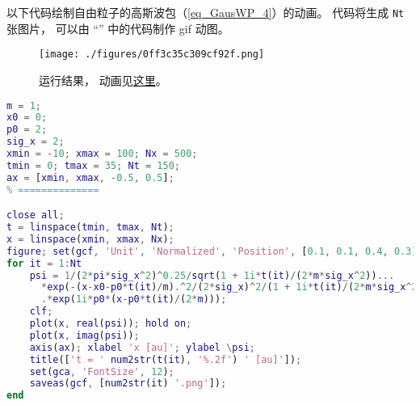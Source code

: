 
\begin{issues}
\issueDraft
\end{issues}


以下代码绘制自由粒子的高斯波包（\autoref{eq_GausWP_4}）的动画。 代码将生成 \verb`Nt` 张图片， 可以由 “” 中的代码制作 gif 动图。

\begin{figure}[ht]
\centering
\texttt{[image: ./figures/0ff3c35c309cf92f.png]}
\caption{运行结果， 动画见\href{https://wuli.wiki/apps/free_gauss.html}{这里}。} \label{fig_FreeGs_1}
\end{figure}

\begin{lstlisting}[language=matlab, caption=free\_gauss.m]
% === 参数 (原子单位) ===
m = 1;
x0 = 0;
p0 = 2;
sig_x = 2;
xmin = -10; xmax = 100; Nx = 500;
tmin = 0; tmax = 35; Nt = 150;
ax = [xmin, xmax, -0.5, 0.5];
% ==============

close all;
t = linspace(tmin, tmax, Nt);
x = linspace(xmin, xmax, Nx);
figure; set(gcf, 'Unit', 'Normalized', 'Position', [0.1, 0.1, 0.4, 0.3]);
for it = 1:Nt
    psi = 1/(2*pi*sig_x^2)^0.25/sqrt(1 + 1i*t(it)/(2*m*sig_x^2))...
      *exp(-(x-x0-p0*t(it)/m).^2/(2*sig_x)^2/(1 + 1i*t(it)/(2*m*sig_x^2)))...
      .*exp(1i*p0*(x-p0*t(it)/(2*m)));
    clf;
    plot(x, real(psi)); hold on;
    plot(x, imag(psi));
    axis(ax); xlabel 'x [au]'; ylabel \psi;
    title(['t = ' num2str(t(it), '%.2f') ' [au]']);
    set(gca, 'FontSize', 12);
    saveas(gcf, [num2str(it) '.png']);
end
\end{lstlisting}
